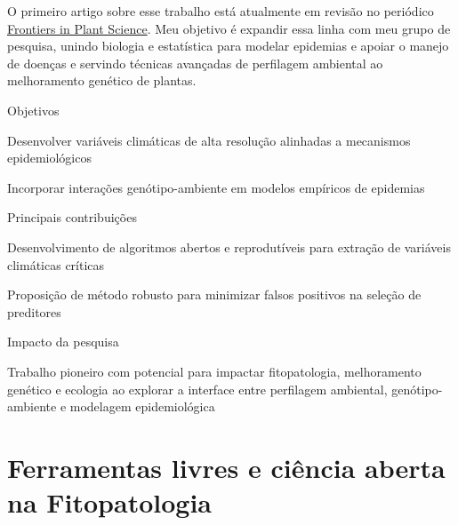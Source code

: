 \documentclass[12pt,a4paper,oneside]{book}
\begin{document}
O primeiro artigo sobre esse trabalho está atualmente em revisão no periódico 
\href{https://www.frontiersin.org/journals/plant-science}{Frontiers in Plant Science}. Meu objetivo é expandir essa linha 
com meu grupo de pesquisa, unindo biologia e estatística para modelar epidemias e apoiar o manejo de doenças e servindo técnicas avançadas de
perfilagem ambiental ao melhoramento genético de plantas.

  
\begin{fancyenum}{\faBullseye}{Objetivos}
 \item Desenvolver variáveis climáticas de alta resolução alinhadas a mecanismos epidemiológicos
 \item Incorporar interações genótipo-ambiente em modelos empíricos de epidemias
\end{fancyenum}
  
\begin{fancyenum}{\faLightbulb}{Principais contribuições}
 \item Desenvolvimento de algoritmos abertos e reprodutíveis para extração de variáveis climáticas críticas
 \item Proposição de método robusto para minimizar falsos positivos na seleção de preditores
\end{fancyenum}
  
\begin{fancyenum}{\faRocket}{Impacto da pesquisa}
 \item Trabalho pioneiro com potencial para impactar fitopatologia, melhoramento genético e ecologia 
  ao explorar a interface entre perfilagem ambiental, genótipo-ambiente e modelagem epidemiológica
\end{fancyenum}
  
  

\section{Ferramentas livres e ciência aberta na Fitopatologia}
\label{sec_msefindr}
\end{document}
